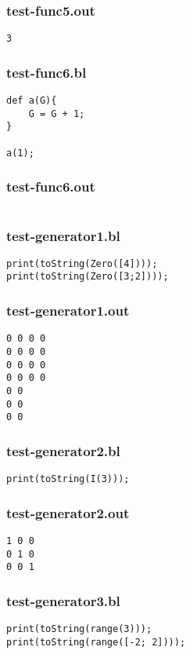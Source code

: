 \subsubsection{test-func5.out}
\begin{lstlisting}
3
\end{lstlisting}
\subsubsection{test-func6.bl}
\begin{lstlisting}
def a(G){
    G = G + 1;
}

a(1);
\end{lstlisting}
\subsubsection{test-func6.out}
\begin{lstlisting}
\end{lstlisting}
\subsubsection{test-generator1.bl}
\begin{lstlisting}
print(toString(Zero([4])));
print(toString(Zero([3;2])));\end{lstlisting}
\subsubsection{test-generator1.out}
\begin{lstlisting}
0 0 0 0
0 0 0 0
0 0 0 0
0 0 0 0
0 0
0 0
0 0\end{lstlisting}
\subsubsection{test-generator2.bl}
\begin{lstlisting}
print(toString(I(3)));\end{lstlisting}
\subsubsection{test-generator2.out}
\begin{lstlisting}
1 0 0
0 1 0
0 0 1\end{lstlisting}
\subsubsection{test-generator3.bl}
\begin{lstlisting}
print(toString(range(3)));
print(toString(range([-2; 2])));
\end{lstlisting}
